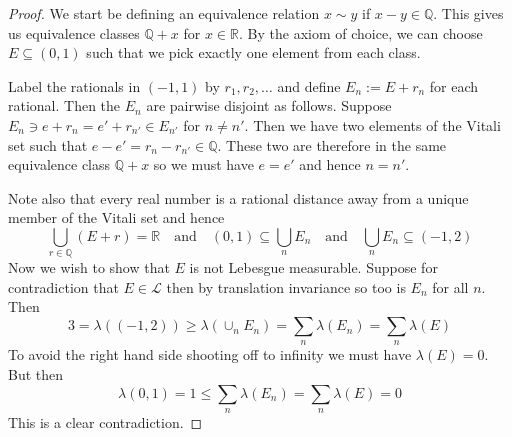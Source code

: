 \documentclass[11pt]{article}
\newcommand{\defeq}{:=}
\newcommand{\R}{\mathbb{R}}
\newcommand{\Q}{\mathbb{Q}}
\begin{document}
\begin{proof}
We start be defining an equivalence relation $x\sim y$ if $x-y\in\Q$.
This gives us equivalence classes $\Q + x$ for $x\in \R$.
By the axiom of choice, we can choose $E\subseteq (0, 1)$ such that we pick exactly one element from each class.

Label the rationals in $(-1,1)$ by $r_1, r_2, \dots$ and define $E_n\defeq E + r_n$ for each rational.
Then the $E_n$ are pairwise disjoint as follows.
Suppose $E_n\ni e+ r_n = e' + r_{n'} \in E_{n'}$ for $n\neq n'$.
Then we have two elements of the Vitali set such that $e-e'=r_n-r_{n'}\in\Q$.
These two are therefore in the same equivalence class $\Q + x$ so we must have $e=e'$ and hence $n=n'$.

Note also that every real number is a rational distance away from a unique member of the Vitali set and hence
\[
	\bigcup_{r\in \Q} (E + r) = \R \quad \text{and} \quad (0,1) \subseteq \bigcup_n E_n \quad \text{and} \quad \bigcup_n E_n \subseteq (-1, 2)
\]
Now we wish to show that $E$ is not Lebesgue measurable.
Suppose for contradiction that $E\in\mathcal{L}$ then by translation invariance so too is $E_n$ for all $n$.
Then
\[
	3 = \lambda( (-1, 2) ) \geq \lambda\left(\cup_n E_n\right) = \sum_n \lambda (E_n) = \sum_n \lambda(E)
\]
To avoid the right hand side shooting off to infinity we must have $\lambda(E) = 0$.
But then
\[
	\lambda(0 ,1 ) = 1 \leq \sum_n \lambda(E_n) = \sum_n \lambda(E) = 0
\]
This is a clear contradiction.
\end{proof}
\end{document}
